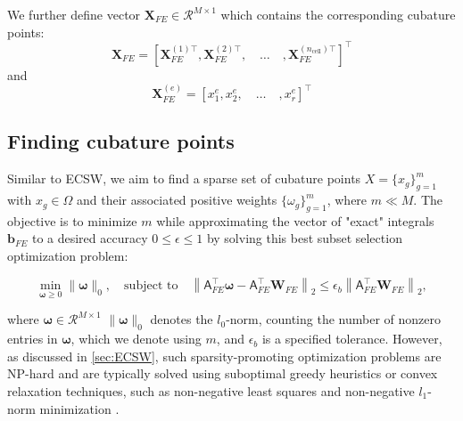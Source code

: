 \documentclass[11pt]{article}
\renewcommand{\vec}[1]{\mathbf{#1}}
\newcommand{\mat}[1]{\mathsf{#1}}
\begin{document}
We further define vector $\vec{X}_{FE}\in\mathcal{R}^{M\times 1}$ which contains  the corresponding cubature points:
\begin{equation}
\mathbf{X}_{FE} = \left[\vec{X}_{FE}^{(1)\top}, 
\vec{X}_{FE}^{(2)\top},\quad
\hdots\quad
,\vec{X}_{FE}^{(n_{\text{cell}})\top}\right]^\top
\label{eq:X_points}
\end{equation}
and
\begin{equation}
\vec{X}_{FE}^{(e)} = \left[ x_1^e, x_2^e, \quad\hdots\quad, x_r^e \right]^\top
\end{equation}





\subsection*{Finding cubature points}
Similar to ECSW, we aim to find a sparse set of cubature points \( X = \{ x_g \}_{g=1}^{m} \) with \( x_g \in \Omega \) and their associated positive weights \( \{ \omega_g \}_{g=1}^{m} \), where \( m \ll M \).
The objective is to minimize \( m \) while approximating the vector of "exact" integrals \( \mathbf{b}_{FE} \) to a desired accuracy \( 0 \leq \epsilon \leq 1 \) by solving this best subset selection optimization problem:










\begin{equation}
\min_{\boldsymbol{\omega} \geq 0} \| \boldsymbol{\omega} \|_0, \quad \text{subject to} \quad \left\| \mat{A}_{FE}^\top \boldsymbol{\omega} - \mat{A}_{FE}^\top \vec{W}_{FE} \right\|_2 \leq \epsilon_b \left\| \mat{A}_{FE}^\top \vec{W}_{FE} \right\|_2,
\label{eq:ecm_opt2}
\end{equation}

where $\boldsymbol{\omega}\in\mathcal{R}^{M\times 1}$ \(\| \boldsymbol{\omega} \|_0\) denotes the \(l_0\)-norm, counting the number of nonzero entries in \(\boldsymbol{\omega}\), which we denote using $m$, and \(\epsilon_b\) is a specified tolerance.
However, as discussed in \cref{sec:ECSW}, such sparsity-promoting optimization problems are NP-hard and are typically solved using suboptimal greedy heuristics or convex relaxation techniques, such as non-negative least squares \cite{NNLSLawsonHanson1995,fastnnls1997} and non-negative \(l_1\)-norm minimization \cite{Patera_2017_EQP}.
\end{document}
